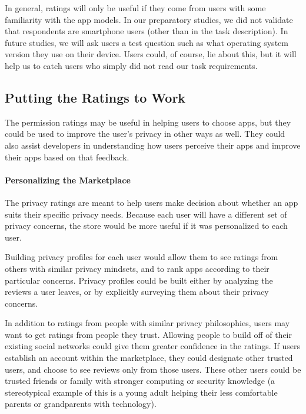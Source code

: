 \documentclass[11pt]{article}
\begin{document}
In general, ratings will only be useful if they come from users with some
familiarity with the app models.
In our preparatory studies, we did not validate that respondents are
smartphone users (other than in the task description). In future
studies, we will ask users a test question such as what operating
system version they use on their device. Users could, of course, lie
about this, but it will help us to catch users who simply did not read
our task requirements.

\subsection{Putting the Ratings to Work}
\label{subsec-app-selection}

The permission ratings may be useful in helping users to choose apps, but
they could be used to improve the user's privacy in other ways as well. They could
also assist developers in understanding how users perceive their apps 
and improve their apps based on that feedback.

\paragraph{Personalizing the Marketplace}
\label{subsubsec-personalizing}

The privacy ratings are meant to help users make decision about whether
an app suits their specific privacy needs. Because each user will have a different
set of privacy concerns, the store would be more useful if it was personalized
to each user.

Building privacy profiles for each user would allow them to see ratings from
others with similar privacy mindsets, and to rank apps according to their
particular concerns. Privacy profiles could be built either by 
analyzing the reviews a user leaves, or by explicitly surveying them about their
privacy concerns. 

In addition to ratings from people with similar privacy philosophies, users may want to get
ratings from people they trust. Allowing people to build off of their existing 
social networks could give them greater confidence in the ratings. If users 
establish an account within the marketplace, they could designate other trusted
users, and choose to see reviews only from those users.
These other users could be trusted friends or family with stronger
computing or security knowledge (a stereotypical example of this is a
young adult helping their less comfortable parents or grandparents with technology).
\end{document}
